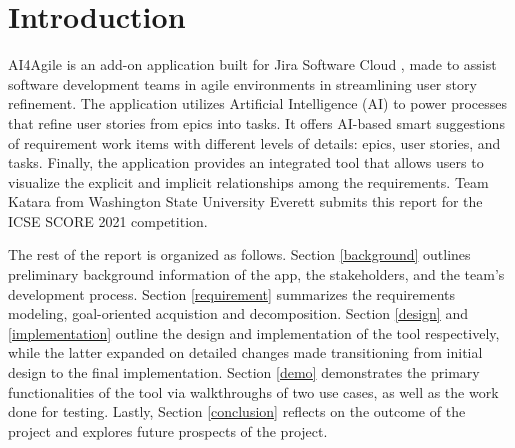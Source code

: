 \section{Introduction}
AI4Agile is an add-on application built for Jira Software Cloud \cite{jira2}, made to assist software development teams in agile environments in streamlining user story refinement. The application utilizes Artificial Intelligence (AI) to power processes that refine user stories from epics into tasks. It offers AI-based smart suggestions of requirement work items with different levels of details: epics, user stories, and tasks. Finally, the application provides an integrated tool that allows users to visualize the explicit and implicit relationships among the requirements. Team Katara from Washington State University Everett submits this report for the ICSE SCORE 2021 competition. 

The rest of the report is organized as follows. Section \ref{background} outlines preliminary background information of the app, the stakeholders, and the team's development process. Section \ref{requirement} summarizes the requirements modeling, goal-oriented acquistion and decomposition. Section \ref{design} and \ref{implementation} outline the design and implementation of the tool respectively, while the latter expanded on detailed changes made transitioning from initial design to the final implementation. Section \ref{demo} demonstrates the primary functionalities of the tool via walkthroughs of two use cases, as well as the work done for testing. Lastly, Section \ref{conclusion} reflects on the outcome of the project and explores future prospects of the project. 
